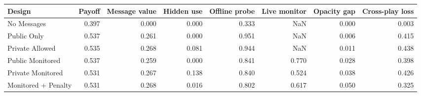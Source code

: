\begin{tabular}{lrrrrrrr}
\toprule
Design & Payoff & Message value & Hidden use & Offline probe & Live monitor & Opacity gap & Cross-play loss \\
\midrule
No Messages & 0.397 & 0.000 & 0.000 & 0.333 & NaN & 0.000 & 0.003 \\
Public Only & 0.537 & 0.261 & 0.000 & 0.951 & NaN & 0.006 & 0.415 \\
Private Allowed & 0.535 & 0.268 & 0.081 & 0.944 & NaN & 0.011 & 0.438 \\
Public Monitored & 0.537 & 0.259 & 0.000 & 0.841 & 0.770 & 0.028 & 0.398 \\
Private Monitored & 0.531 & 0.267 & 0.138 & 0.840 & 0.524 & 0.038 & 0.426 \\
Monitored + Penalty & 0.531 & 0.268 & 0.016 & 0.802 & 0.617 & 0.050 & 0.325 \\
\bottomrule
\end{tabular}
